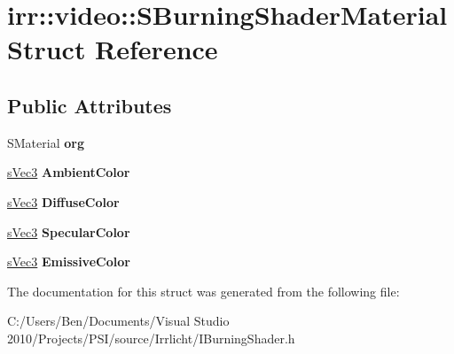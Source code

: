 \hypertarget{structirr_1_1video_1_1_s_burning_shader_material}{\section{irr\-:\-:video\-:\-:S\-Burning\-Shader\-Material Struct Reference}
\label{structirr_1_1video_1_1_s_burning_shader_material}
}
\subsection*{Public Attributes}
\begin{DoxyCompactItemize}
\item 
\hypertarget{structirr_1_1video_1_1_s_burning_shader_material_a78c45d2528a43a94eef6197a9f665b90}{S\-Material {\bfseries org}}\label{structirr_1_1video_1_1_s_burning_shader_material_a78c45d2528a43a94eef6197a9f665b90}

\item 
\hypertarget{structirr_1_1video_1_1_s_burning_shader_material_ac114aedf098e6a3aca7583bb4a50620a}{\hyperlink{structirr_1_1video_1_1s_vec3}{s\-Vec3} {\bfseries Ambient\-Color}}\label{structirr_1_1video_1_1_s_burning_shader_material_ac114aedf098e6a3aca7583bb4a50620a}

\item 
\hypertarget{structirr_1_1video_1_1_s_burning_shader_material_a8f8c2ecbf417ebb8ceb7fded2f357fe6}{\hyperlink{structirr_1_1video_1_1s_vec3}{s\-Vec3} {\bfseries Diffuse\-Color}}\label{structirr_1_1video_1_1_s_burning_shader_material_a8f8c2ecbf417ebb8ceb7fded2f357fe6}

\item 
\hypertarget{structirr_1_1video_1_1_s_burning_shader_material_af79ba56a10fb3477e1f5317af50484ed}{\hyperlink{structirr_1_1video_1_1s_vec3}{s\-Vec3} {\bfseries Specular\-Color}}\label{structirr_1_1video_1_1_s_burning_shader_material_af79ba56a10fb3477e1f5317af50484ed}

\item 
\hypertarget{structirr_1_1video_1_1_s_burning_shader_material_a46ec311ff0ebe6c4337021c5f8bc7bf7}{\hyperlink{structirr_1_1video_1_1s_vec3}{s\-Vec3} {\bfseries Emissive\-Color}}\label{structirr_1_1video_1_1_s_burning_shader_material_a46ec311ff0ebe6c4337021c5f8bc7bf7}

\end{DoxyCompactItemize}


The documentation for this struct was generated from the following file\-:\begin{DoxyCompactItemize}
\item 
C\-:/\-Users/\-Ben/\-Documents/\-Visual Studio 2010/\-Projects/\-P\-S\-I/source/\-Irrlicht/I\-Burning\-Shader.\-h\end{DoxyCompactItemize}
